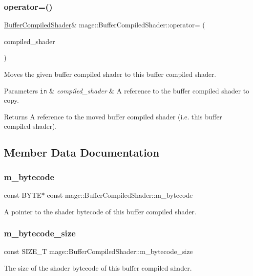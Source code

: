 \subsubsection{\texorpdfstring{operator=()}{operator=()}\hspace{0.1cm}{\footnotesize\ttfamily [2/2]}}
{\footnotesize\ttfamily \hyperlink{structmage_1_1_buffer_compiled_shader}{Buffer\+Compiled\+Shader}\& mage\+::\+Buffer\+Compiled\+Shader\+::operator= (\begin{DoxyParamCaption}\item[{\hyperlink{structmage_1_1_buffer_compiled_shader}{Buffer\+Compiled\+Shader} \&\&}]{compiled\+\_\+shader }\end{DoxyParamCaption})\hspace{0.3cm}{\ttfamily [delete]}}

Moves the given buffer compiled shader to this buffer compiled shader.


\begin{DoxyParams}[1]{Parameters}
\mbox{\tt in}  & {\em compiled\+\_\+shader} & A reference to the buffer compiled shader to copy. \\
\hline
\end{DoxyParams}
\begin{DoxyReturn}{Returns}
A reference to the moved buffer compiled shader (i.\+e. this buffer compiled shader). 
\end{DoxyReturn}


\subsection{Member Data Documentation}
\hypertarget{structmage_1_1_buffer_compiled_shader_a51e10b328a0b6d2ffaf9c9b7d72fac2f}{}\label{structmage_1_1_buffer_compiled_shader_a51e10b328a0b6d2ffaf9c9b7d72fac2f} 
\subsubsection{\texorpdfstring{m\+\_\+bytecode}{m\_bytecode}}
{\footnotesize\ttfamily const B\+Y\+TE$\ast$ const mage\+::\+Buffer\+Compiled\+Shader\+::m\+\_\+bytecode\hspace{0.3cm}{\ttfamily [private]}}

A pointer to the shader bytecode of this buffer compiled shader. \hypertarget{structmage_1_1_buffer_compiled_shader_acefda4296642b7de44f3b242dc76b05f}{}\label{structmage_1_1_buffer_compiled_shader_acefda4296642b7de44f3b242dc76b05f} 
\subsubsection{\texorpdfstring{m\+\_\+bytecode\+\_\+size}{m\_bytecode\_size}}
{\footnotesize\ttfamily const S\+I\+Z\+E\+\_\+T mage\+::\+Buffer\+Compiled\+Shader\+::m\+\_\+bytecode\+\_\+size\hspace{0.3cm}{\ttfamily [private]}}

The size of the shader bytecode of this buffer compiled shader. 